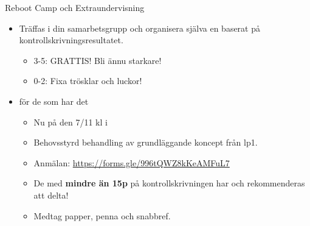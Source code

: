 \begin{Slide}{Reboot Camp och Extraundervisning}

\begin{itemize}
  \item
  Träffas i din samarbetsgrupp och organisera själva en  baserat på kontrollskrivningsresultatet.

  \begin{itemize}
    \item
    3-5: GRATTIS! Bli ännu starkare!
    \item
    0-2: Fixa trösklar och luckor!
  \end{itemize}

  \item {} för de som har det 
  \begin{itemize}
    \item Nu på  den 7/11 kl  i 
    \item Behovsstyrd behandling av grundläggande koncept från lp1.
    \item Anmälan: {\small \url{https://forms.gle/996tQWZ8kKeAMFuL7}}
    \item De med \textbf{mindre än 15p} på kontrollskrivningen har  och rekommenderas  att delta!
    \item Medtag papper, penna och snabbref.
  \end{itemize}

\end{itemize}


\vspace{0.5em}  \\\vspace{0.5em} 
\end{Slide}

